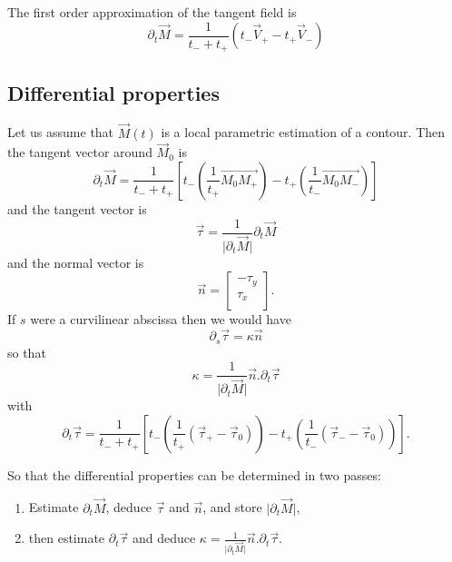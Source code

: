 \documentclass[aps]{revtex4}
\newcommand{\myvec}[1]{\overrightarrow{#1}}
\begin{document}
The first order approximation of the tangent field is
\begin{equation}
	\partial_t \vec{M} =  \frac{1}{t_-+t_+} \left(t_-\vec{V}_+ - t_+ \vec{V}_-\right)
\end{equation}

\subsection{Differential properties}
Let us assume that $\vec{M}(t)$ is a local parametric estimation of a contour.
Then the tangent vector around $\vec{M}_0$ is
\begin{equation}
	\partial_t \vec{M} = 
	 \frac{1}{t_-+t_+} \left\lbrack t_-\left(\frac{1}{t_+}\myvec{M_0M_+}\right) - t_+ \left(\frac{1}{t_-}\myvec{M_0M_-}\right)\right\rbrack
\end{equation}
and the tangent vector is
\begin{equation}
	\vec{\tau} = \frac{1}{\vert \partial_t \vec{M} \vert} \partial_t \vec{M}
\end{equation}
and the normal vector is
\begin{equation}
	\vec{n} = \begin{bmatrix}
		-\tau_y\\
		\tau_x\\
	\end{bmatrix}.
\end{equation}
If $s$ were a curvilinear abscissa then we would have
\begin{equation}
	\partial_s \vec{\tau} = \kappa \vec{n}
\end{equation}
so that
\begin{equation}
	\kappa = \frac{1}{\vert\partial_t \vec{M}\vert} \vec{n}.\partial_t \vec{\tau}
\end{equation}
with
\begin{equation}
	\partial_t \vec{\tau} = \frac{1}{t_-+t_+}
	 \left\lbrack 
	 t_-\left(\frac{1}{t_+}\left(\vec{\tau}_+ - \vec{\tau}_0\right)\right) 
	- 
	t_+ \left(\frac{1}{t_-}\left(\vec{\tau}_- - \vec{\tau}_0\right)\right)
	\right\rbrack.
\end{equation}

So that the differential properties can be determined in two passes:
\begin{enumerate}
	\item Estimate $\partial_t \vec{M}$, deduce $\vec{\tau}$ and $\vec{n}$, and store $\vert\partial_t \vec{M}\vert$,
	\item then estimate $\partial_t \vec{\tau}$ and deduce $\kappa = \frac{1}{\vert\partial_t \vec{M}\vert} \vec{n}.\partial_t \vec{\tau}$.
\end{enumerate}
\end{document}
